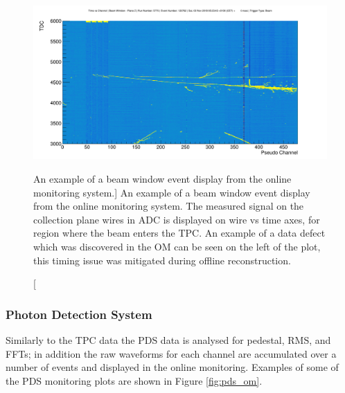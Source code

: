 \begin{figure}

	\centering

	\includegraphics[width=\textwidth]{figures/beam_evd.png}

	\caption
	[An example of a beam window event display from the \protodune{} online
	monitoring system.]
	{An example of a beam window event display from the \protodune{} online
	monitoring system. The measured signal on the collection plane wires in ADC 
	is displayed on wire vs time axes, for region where the beam enters the TPC. 
	An example of a data defect which was discovered in the OM can be seen on the 
	left of the plot, this timing issue was mitigated during offline
	reconstruction.}

	\label{fig:beam_evd}

\end{figure}

\subsubsection*{Photon Detection System}
Similarly to the TPC data the PDS data is analysed for pedestal, RMS, and FFTs;
in addition the raw waveforms for each channel are accumulated over a number of
events and displayed in the online monitoring. Examples of some of the PDS 
monitoring plots are shown in Figure \ref{fig:pds_om}.

